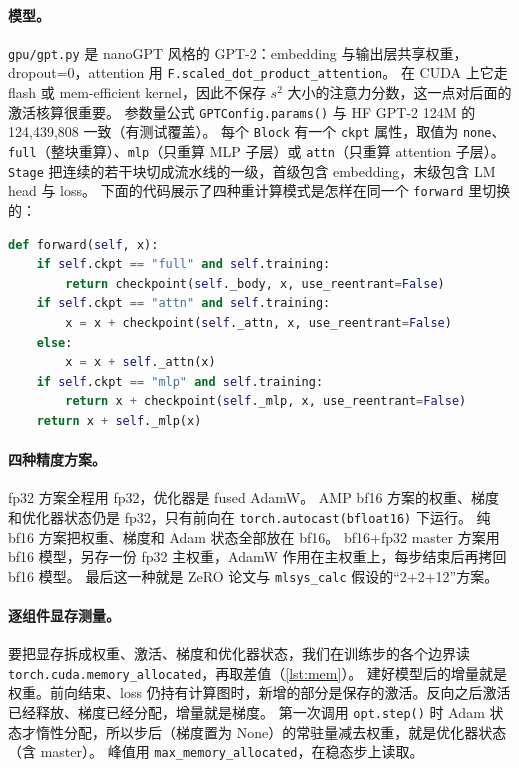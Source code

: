 \documentclass[11pt,a4paper]{ctexart}
\begin{document}
\paragraph{模型。} \texttt{gpu/gpt.py} 是 nanoGPT 风格的 GPT-2：embedding 与输出层共享权重，dropout=0，attention 用 \texttt{F.scaled\_dot\_product\_attention}。
在 CUDA 上它走 flash 或 mem-efficient kernel，因此不保存 $s^2$ 大小的注意力分数，这一点对后面的激活核算很重要。
参数量公式 \texttt{GPTConfig.params()} 与 HF GPT-2 124M 的 124,439,808 一致（有测试覆盖）。
每个 \texttt{Block} 有一个 \texttt{ckpt} 属性，取值为 \texttt{none}、\texttt{full}（整块重算）、\texttt{mlp}（只重算 MLP 子层）或 \texttt{attn}（只重算 attention 子层）。
\texttt{Stage} 把连续的若干块切成流水线的一级，首级包含 embedding，末级包含 LM head 与 loss。
下面的代码展示了四种重计算模式是怎样在同一个 \texttt{forward} 里切换的：

\begin{lstlisting}[language=Python,caption={每块重计算模式（gpu/gpt.py）}]
def forward(self, x):
    if self.ckpt == "full" and self.training:
        return checkpoint(self._body, x, use_reentrant=False)
    if self.ckpt == "attn" and self.training:
        x = x + checkpoint(self._attn, x, use_reentrant=False)
    else:
        x = x + self._attn(x)
    if self.ckpt == "mlp" and self.training:
        return x + checkpoint(self._mlp, x, use_reentrant=False)
    return x + self._mlp(x)
\end{lstlisting}

\paragraph{四种精度方案。}
fp32 方案全程用 fp32，优化器是 fused AdamW。
AMP bf16 方案的权重、梯度和优化器状态仍是 fp32，只有前向在 \texttt{torch.autocast(bfloat16)} 下运行。
纯 bf16 方案把权重、梯度和 Adam 状态全部放在 bf16。
bf16+fp32 master 方案用 bf16 模型，另存一份 fp32 主权重，AdamW 作用在主权重上，每步结束后再拷回 bf16 模型。
最后这一种就是 ZeRO 论文与 \texttt{mlsys\_calc} 假设的“2+2+12”方案。

\paragraph{逐组件显存测量。} 要把显存拆成权重、激活、梯度和优化器状态，我们在训练步的各个边界读 \texttt{torch.cuda.memory\_allocated}，再取差值（\cref{lst:mem}）。
建好模型后的增量就是权重。前向结束、loss 仍持有计算图时，新增的部分是保存的激活。反向之后激活已经释放、梯度已经分配，增量就是梯度。
第一次调用 \texttt{opt.step()} 时 Adam 状态才惰性分配，所以步后（梯度置为 None）的常驻量减去权重，就是优化器状态（含 master）。
峰值用 \texttt{max\_memory\_allocated}，在稳态步上读取。
\end{document}
